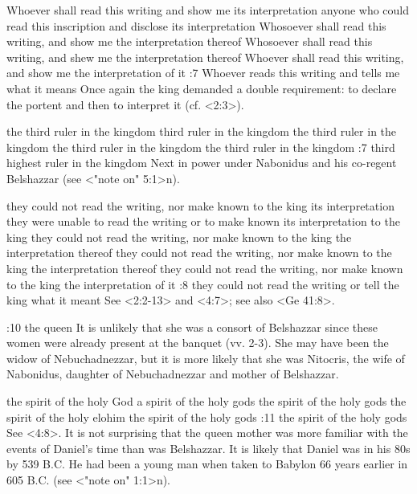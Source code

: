     {Whoever shall read this writing and show me its interpretation} %
    {anyone who could read this inscription and disclose its interpretation} %
    {Whosoever shall read this writing, and show me the interpretation thereof} %
    {Whosoever shall read this writing, and shew me the interpretation thereof} %
    {Whoever shall read this writing, and show me the interpretation of it} %
:7 {Whoever reads this writing and tells me what it means}
Once again the king demanded a double requirement: to declare the portent and then to
interpret it (cf. <2:3>).

    {the third ruler in the kingdom} %
    {third ruler in the kingdom} %
    {the third ruler in the kingdom} %
    {the third ruler in the kingdom} %
    {the third ruler in the kingdom} %
:7 {third highest ruler in the kingdom} Next in power under Nabonidus and his
co-regent Belshazzar (see <"note on" 5:1>n).

    {they could not read the writing, nor make known to the king its interpretation} %
    {they were unable to read the writing or to make known its interpretation to the king} %
    {they could not read the writing, nor make known to the king the interpretation thereof} %
    {they could not read the writing, nor make known to the king the interpretation thereof} %
    {they could not read the writing, nor make known to the king the interpretation of it} %
:8 {they could not read the writing or tell the king what it meant}
   See <2:2-13> and <4:7>; see also <Ge 41:8>.

:10 {the queen} %
It is unlikely that she was a consort of Belshazzar since these women were already present at the banquet
(vv. 2-3). She may have been the widow of Nebuchadnezzar, but it is more likely that she was
Nitocris, the wife of Nabonidus, daughter of Nebuchadnezzar and mother of Belshazzar.

    {the spirit of the holy God} %
    {a spirit of the holy gods} %
    {the spirit of the holy gods} %
    {the spirit of the holy elohim} %
    {the spirit of the holy gods} %
:11 {the spirit of the holy gods} See <4:8>. It is not surprising that the queen mother was
more familiar with the events of Daniel's time than was Belshazzar. It is likely that Daniel was in his 80s by  
539 B.C. He had been a young man when taken to Babylon 66 years 
earlier in 605 B.C. (see <"note on" 1:1>n).

